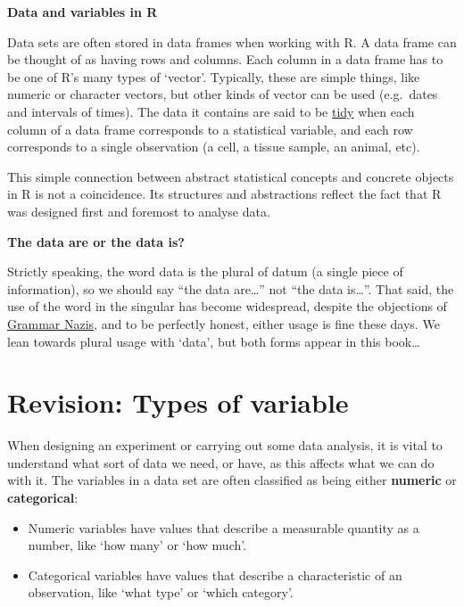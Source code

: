 \documentclass[
]{book}
\providecommand{\tightlist}{%
  \setlength{\itemsep}{0pt}\setlength{\parskip}{0pt}}
\newenvironment{greybox}{
  \definecolor{shadecolor}{rgb}{0.95,0.95,0.95}  %
  \color{black}
  \begin{shaded}}
 {\end{shaded}}
\newenvironment{infobox}[1]
  {
  \begin{itemize}
  \renewcommand{\labelitemi}{
    \raisebox{-.7\height}[0pt][0pt]{
      {\setkeys{Gin}{width=3em,keepaspectratio}
        \texttt{[image: images/\#1]}}
    }
  }
  \setlength{\fboxsep}{1em}
  \begin{greybox}
  \item
  }
  {
  \end{greybox}
  \end{itemize}
  }
\begin{document}
\begin{infobox}{information}
\textbf{Data and variables in R}

Data sets are often stored in data frames when working with R. A data frame can be thought of as having rows and columns. Each column in a data frame has to be one of R's many types of `vector'. Typically, these are simple things, like numeric or character vectors, but other kinds of vector can be used (e.g.~dates and intervals of times). The data it contains are said to be \href{https://cran.r-project.org/web/packages/tidyr/vignettes/tidy-data.html}{tidy} when each column of a data frame corresponds to a statistical variable, and each row corresponds to a single observation (a cell, a tissue sample, an animal, etc).

This simple connection between abstract statistical concepts and concrete objects in R is not a coincidence. Its structures and abstractions reflect the fact that R was designed first and foremost to analyse data.

\end{infobox}

\begin{infobox}{information}
\textbf{The data are or the data is?}

Strictly speaking, the word data is the plural of datum (a single piece of information), so we should say ``the data are\ldots{}'' not ``the data is\ldots{}''. That said, the use of the word in the singular has become widespread, despite the objections of \href{http://www.urbandictionary.com/define.php?term=Grammar\%20Nazi}{Grammar Nazis}, and to be perfectly honest, either usage is fine these days. We lean towards plural usage with `data', but both forms appear in this book\ldots{}

\end{infobox}

\hypertarget{var-types}{%
\section{Revision: Types of variable}\label{var-types}}

When designing an experiment or carrying out some data analysis, it is vital to understand what sort of data we need, or have, as this affects what we can do with it. The variables in a data set are often classified as being either \textbf{numeric} or \textbf{categorical}:

\begin{itemize}
\tightlist
\item
  Numeric variables have values that describe a measurable quantity as a number, like `how many' or `how much'.
\item
  Categorical variables have values that describe a characteristic of an observation, like `what type' or `which category'.
\end{itemize}
\end{document}
